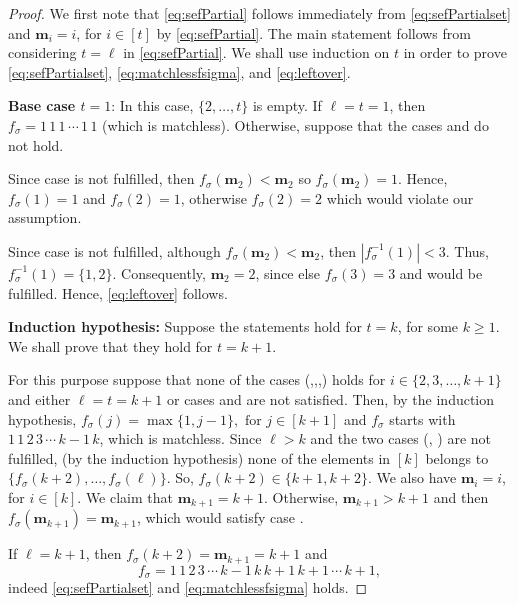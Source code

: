 \documentclass[reqno]{amsart}
\theoremstyle{definition}
\newcommand{\img}{\mathbf{m}}
\begin{document}
\begin{proof}
We first note that \eqref{eq:sefPartial} follows immediately from \eqref{eq:sefPartialset} and  $\img_i=i$, for $i\in[t]$ by \eqref{eq:sefPartial}. The main statement follows from considering $t=\ell$ in \eqref{eq:sefPartial}.
We shall use induction on $t$ in order to prove \eqref{eq:sefPartialset}, \eqref{eq:matchlessfsigma}, and \eqref{eq:leftover}.

\medskip

\noindent\textbf{Base case $t=1$}: 
In this case, $\{2,\dotsc,t\}$ is empty.
If $\ell=t=1$, then $f_\sigma=1\,1\,1\,\dotsm\,1\,1$ (which is matchless). 
Otherwise, suppose that the cases \caseOne[t+1] and \caseTwo[t+1] do not hold. 

Since case \caseOne[2] is not fulfilled, then
$f_{\sigma}(\img_2)<\img_2$ so $f_{\sigma}(\img_2)=1$.
Hence, $f_{\sigma}(1)=1$ and 
$f_{\sigma}(2)=1$, otherwise $f_{\sigma}(2)=2$ 
which would violate our assumption.

Since case \caseTwo[2] is not fulfilled, although
$f_{\sigma}(\img_2)<\img_2$, then $|f_{\sigma}^{-1}(1)|<3$.
Thus, $f_{\sigma}^{-1}(1)=\{1,2\}$.
 Consequently, $\img_2=2$, since else $f_\sigma(3)=3$ and \caseOne[2] would be fulfilled. Hence, \eqref{eq:leftover} follows.

\bigskip 
\noindent
\textbf{Induction hypothesis:}
Suppose the statements hold for $t=k$, 
for some $k\geq 1$. We shall prove that they hold for $t=k+1$. 
\medskip

For this purpose suppose that none of the cases (\caseOne,\caseTwo,\caseThree,\caseFour)
holds for $i \in \{2,3,\dotsc,k+1\}$ and either $\ell=t=k+1$ or cases 
\caseOne[k+2] and \caseTwo[k+2] are not satisfied. Then, by the induction hypothesis, $f_\sigma(j)=\max\{1,j-1\},\text{ for }j\in[k+1]$ and $f_\sigma$ starts with $1\,1\,2\,3\,\dotsm\,k{-}1\,k$,
which is matchless. Since $\ell>k$ and the 
two cases (\caseOne[k+1], \caseTwo[k+1]) are not 
fulfilled, (by the induction 
hypothesis) none of the elements in $[k]$ 
belongs to 
$\{f_\sigma(k+2),\dotsc,f_\sigma(\ell)\}$. 
So, $f_\sigma(k+2)\in\{k+1, k+2\}$. We also have 
$\img_i=i$, for $i\in[k]$. We claim that 
$\img_{k+1}=k+1$. Otherwise, 
$\img_{k+1}>k+1$ and then 
$f_\sigma(\img_{k+1})=\img_{k+1}$, which would satisfy case \caseOne[k+1]. 
\medskip

If $\ell=k+1$, then $f_\sigma(k+2)=\img_{k+1}=k+1$ and
\[
f_\sigma=1\,1\,2\,3\,\dotsm\,k{-}1\,k\,k{+}1\,k{+}1\,\dotsm\,k{+}1,
\]
 indeed \eqref{eq:sefPartialset} and \eqref{eq:matchlessfsigma} holds.
\medskip


\end{proof}
\end{document}
